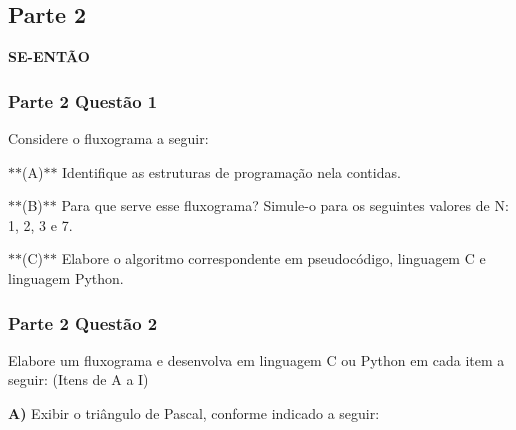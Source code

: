 \subsection*{Parte 2}

{\bfseries{S\+E-\/\+E\+N\+TÃO}}

\subsubsection*{Parte 2 Questão 1}

Considere o fluxograma a seguir\+: {\texttt{ }}


\begin{DoxyItemize}
\item $\ast$$\ast$(A)$\ast$$\ast$ Identifique as estruturas de programação nela contidas.
\item $\ast$$\ast$(B)$\ast$$\ast$ Para que serve esse fluxograma? Simule-\/o para os seguintes valores de N\+: 1, 2, 3 e 7.
\item $\ast$$\ast$(C)$\ast$$\ast$ Elabore o algoritmo correspondente em pseudocódigo, linguagem C e linguagem Python.
\end{DoxyItemize}

\subsubsection*{Parte 2 Questão 2}

Elabore um fluxograma e desenvolva em linguagem C ou Python em cada item a seguir\+: (Itens de A a I)


\begin{DoxyItemize}
\item {\bfseries{A)}} Exibir o triângulo de Pascal, conforme indicado a seguir\+:
\end{DoxyItemize}


\begin{DoxyCode}{0}
\DoxyCodeLine{}
\DoxyCodeLine{}
\DoxyCodeLine{}
\DoxyCodeLine{}
\DoxyCodeLine{}
\end{DoxyCode}



